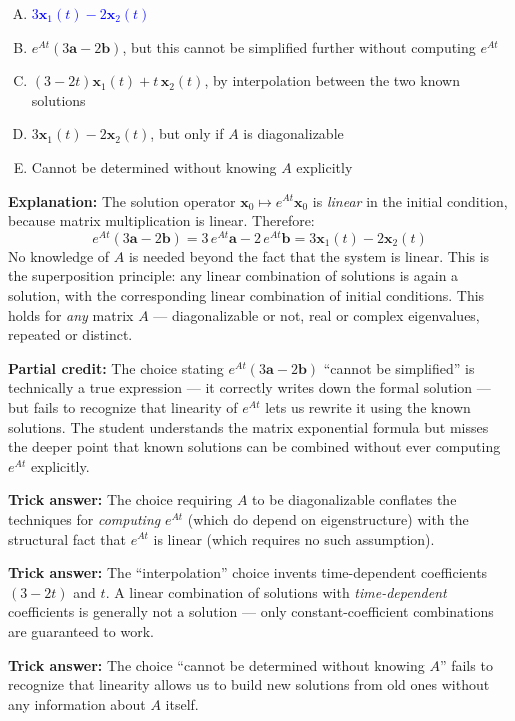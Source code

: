 \documentclass[12pt]{amsart}
\begin{document}
\begin{enumerate}[(A)]
\item \textcolor{blue}{\textbf{$3\mathbf{x}_1(t) - 2\mathbf{x}_2(t)$}}
\item $e^{At}(3\mathbf{a} - 2\mathbf{b})$, but this cannot be simplified
      further without computing $e^{At}$
\item $(3-2t)\mathbf{x}_1(t) + t\,\mathbf{x}_2(t)$, by interpolation
      between the two known solutions
\item $3\mathbf{x}_1(t) - 2\mathbf{x}_2(t)$, but only if $A$ is diagonalizable
\item Cannot be determined without knowing $A$ explicitly
\end{enumerate}

\textbf{Explanation:}
The solution operator $\mathbf{x}_0 \mapsto e^{At}\mathbf{x}_0$ is
\emph{linear} in the initial condition, because matrix multiplication
is linear. Therefore:
$$e^{At}(3\mathbf{a} - 2\mathbf{b})
  = 3\,e^{At}\mathbf{a} - 2\,e^{At}\mathbf{b}
  = 3\mathbf{x}_1(t) - 2\mathbf{x}_2(t)$$
No knowledge of $A$ is needed beyond the fact that the system is linear.
This is the superposition principle: any linear combination of solutions
is again a solution, with the corresponding linear combination of initial
conditions. This holds for \emph{any} matrix $A$ --- diagonalizable or
not, real or complex eigenvalues, repeated or distinct.

\textbf{Partial credit:}
The choice stating $e^{At}(3\mathbf{a} - 2\mathbf{b})$ ``cannot be
simplified'' is technically a true expression --- it correctly writes
down the formal solution --- but fails to recognize that linearity of
$e^{At}$ lets us rewrite it using the known solutions. The student
understands the matrix exponential formula but misses the deeper point
that known solutions can be combined without ever computing $e^{At}$
explicitly.

\textbf{Trick answer:}
The choice requiring $A$ to be diagonalizable conflates the techniques
for \emph{computing} $e^{At}$ (which do depend on eigenstructure) with
the structural fact that $e^{At}$ is linear (which requires no such
assumption).

\textbf{Trick answer:}
The ``interpolation'' choice invents time-dependent coefficients
$(3-2t)$ and $t$. A linear combination of solutions with
\emph{time-dependent} coefficients is generally not a solution ---
only constant-coefficient combinations are guaranteed to work.

\textbf{Trick answer:}
The choice ``cannot be determined without knowing $A$'' fails to
recognize that linearity allows us to build new solutions from old ones
without any information about $A$ itself.
\end{document}
